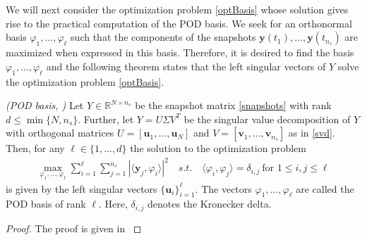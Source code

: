 We will next consider the optimization problem \eqref{optBasis} whose solution gives rise to the practical computation of the POD basis. We seek for an orthonormal basis $\varphi_1,...,\varphi_\ell$ such that the components of the snapshots $\mathbf{y}(t_1),...,\mathbf{y}(t_{n_s})$ are maximized when expressed in this basis. Therefore, it is desired to find the basis $\varphi_1,...,\varphi_\ell$ and the following theorem states that the left singular vectors of $Y$ solve the optimization problem \eqref{optBasis}.
\begin{theorem}
\emph{(POD basis, \cite{V11})}
\label{podthm}
Let $Y \in \mathbb{R}^{N \times n_s}$ be the snapshot matrix \eqref{snapshots} with rank $d \leq \min \{N,n_s\}$. Further, let $Y = U \Sigma V^T$ be the singular value decomposition of $Y$ with orthogonal matrices $U = [\mathbf{u}_1,...,\mathbf{u}_N]$ and $V = [\mathbf{v}_1,...,\mathbf{v}_{n_s}]$ as in \eqref{svd}. Then, for any $\ell \in \{1,...,d\}$ the solution to the optimization problem
\begin{align}
\label{optBasis}
\max_{\varphi_1,...,\varphi_\ell} \sum_{i=1}^\ell \sum_{j=1}^{n_s} |\langle \mathbf{y}_j , \varphi_i \rangle|^2 \quad s.t. \quad \langle \varphi_i,\varphi_j\rangle = \delta_{i,j} \ \text{for } 1 \leq i,j \leq \ell
\end{align}
is given by the left singular vectors $\{ \mathbf{u}_i \}_{i=1}^\ell$. The vectors $\varphi_1,...,\varphi_\ell$ are called the POD basis of rank $\ell$. Here, $\delta_{i,j}$ denotes the Kronecker delta.
\end{theorem}
\begin{proof}
The proof is given in \cite[p. 5-6]{V11}
\end{proof}

